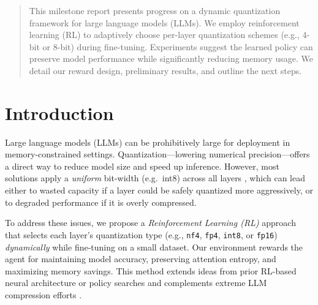\documentclass{article}
\begin{document}

\printAffiliationsAndNotice{}

\begin{abstract}
This milestone report presents progress on a dynamic quantization framework for large language models (LLMs). We employ reinforcement learning (RL) to adaptively choose per-layer quantization schemes (e.g., 4-bit or 8-bit) during fine-tuning. Experiments suggest the learned policy can preserve model performance while significantly reducing memory usage. We detail our reward design, preliminary results, and outline the next steps.
\end{abstract}

\section{Introduction}
Large language models (LLMs) can be prohibitively large for deployment in memory-constrained settings. Quantization---lowering numerical precision---offers a direct way to reduce model size and speed up inference. However, most solutions apply a \emph{uniform} bit-width (e.g.\ int8) across all layers \cite{Dettmers2022llm,Sun2023qlora}, which can lead either to wasted capacity if a layer could be safely quantized more aggressively, or to degraded performance if it is overly compressed.

To address these issues, we propose a \emph{Reinforcement Learning (RL)} approach that selects each layer's quantization type (e.g., \texttt{nf4}, \texttt{fp4}, \texttt{int8}, or \texttt{fp16}) \emph{dynamically} while fine-tuning on a small dataset. Our environment rewards the agent for maintaining model accuracy, preserving attention entropy, and maximizing memory savings. This method extends ideas from prior RL-based neural architecture or policy searches \cite{Zoph2017RL,Wang2020apq} and complements extreme LLM compression efforts \cite{egiazarian2024extreme,malinovskii2024pvtuning}.
\end{document}
